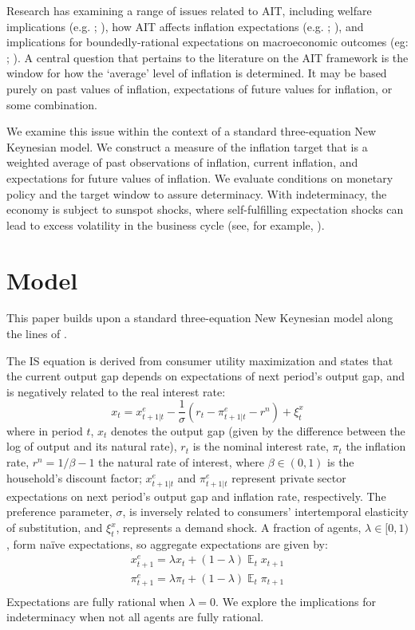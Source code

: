 \documentclass[english,authoryear,12pt]{elsarticle}
\DeclareMathOperator{\E}{\mathbb{E}}
\begin{document}
Research has examining a range of issues related to AIT, including welfare implications (e.g. \citealp{budianto2020}; \citealp{eo2020}), how AIT affects inflation expectations (e.g. \citealp{coibion2020}; \citealp{hoffmann2022}), and implications for boundedly-rational expectations on macroeconomic outcomes (eg: \citealp{honka2021}; \citealp{budianto2020}). A central question that pertains to the literature on the AIT framework is the window for how the `average' level of inflation is determined. It may be based purely on past values of inflation, expectations of future values for inflation, or some combination.

We examine this issue within the context of a standard three-equation New Keynesian model. We construct a measure of the inflation target that is a weighted average of past observations of inflation, current inflation, and expectations for future values of inflation. We evaluate conditions on monetary policy and the target window to assure determinacy. With indeterminacy, the economy is subject to sunspot shocks, where self-fulfilling expectation shocks can lead to excess volatility in the business cycle (see, for example, \citealp{lubik2004}).

\section{\label{Model}Model}
This paper builds upon a standard three-equation New Keynesian model along the lines of \cite{clarida1999}.

The IS equation is derived from consumer utility maximization and states that the current output gap depends on expectations of next period's output gap, and is negatively related to the real interest rate:
\begin{equation}\label{eq:ISe}
	x_t = x_{t+1|t}^e - \frac{1}{\sigma} \left( r_t - \pi_{t+1|t}^e  - r^n  \right) + \xi_t^{x}
\end{equation}
where in period $t$, $x_t$ denotes the output gap (given by the difference between the log of output and its natural rate), $r_t$ is the nominal interest rate, $\pi_t$ the inflation rate, $r^n = 1/\beta - 1$ the natural rate of interest, where $\beta \in (0,1)$ is the household's discount factor; $x_{t+1|t}^e$ and $\pi_{t+1|t}^e$ represent private sector expectations on next period's output gap and inflation rate, respectively. The preference parameter, $\sigma$, is inversely related to consumers' intertemporal elasticity of substitution, and $\xi_t^x$, represents a demand shock. A fraction of agents, $\lambda\in[0,1)$, form na\"ive expectations, so aggregate expectations are given by:
\begin{equation}
	\begin{array}{c}
		x_{t+1}^e = \lambda x_t + (1-\lambda) \E_t x_{t+1} \\ [1.5pc]
		\pi_{t+1}^e = \lambda \pi_t + (1-\lambda) \E_t \pi_{t+1} \\
	\end{array}
\end{equation}
Expectations are fully rational when $\lambda=0$. We explore the implications for indeterminacy when not all agents are fully rational.
\end{document}
